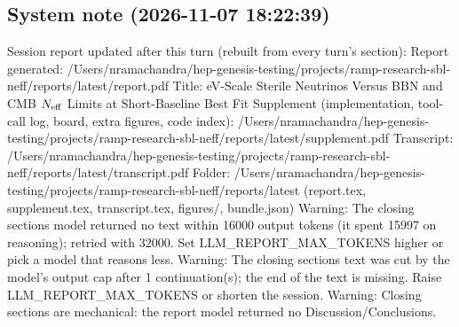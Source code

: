 \documentclass[11pt,a4paper]{article}
\begin{document}
\subsection*{System note \small(2026-11-07 18:22:39)}
Session report updated after this turn (rebuilt from every turn's section): Report generated: /Users/nramachandra/hep-genesis-testing/projects/ramp-research-sbl-neff/reports/latest/report.pdf Title: eV-Scale Sterile Neutrinos Versus BBN and CMB $N_{\rm eff}$ Limits at Short-Baseline Best Fit Supplement (implementation, tool-call log, board, extra figures, code index): /Users/nramachandra/hep-genesis-testing/projects/ramp-research-sbl-neff/reports/latest/supplement.pdf Transcript: /Users/nramachandra/hep-genesis-testing/projects/ramp-research-sbl-neff/reports/latest/transcript.pdf Folder: /Users/nramachandra/hep-genesis-testing/projects/ramp-research-sbl-neff/reports/latest (report.tex, supplement.tex, transcript.tex, figures/, bundle.json) Warning: The closing sections model returned no text within 16000 output tokens (it spent 15997 on reasoning); retried with 32000. Set LLM\_REPORT\_MAX\_TOKENS higher or pick a model that reasons less. Warning: The closing sections text was cut by the model's output cap after 1 continuation(s); the end of the text is missing. Raise LLM\_REPORT\_MAX\_TOKENS or shorten the session. Warning: Closing sections are mechanical: the report model returned no Discussion/Conclusions.
\end{document}
